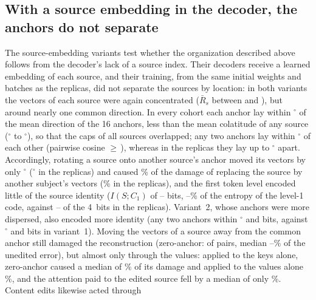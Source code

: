 \documentclass[10pt,letterpaper]{article}
\newcommand{\Rbar}{\bar{R}}
\begin{document}
\subsection*{With a source embedding in the decoder, the anchors do not separate}\label{sec:res-variants}

The source-embedding variants test whether the organization described above follows from the
decoder's lack of a source index. Their decoders receive a learned embedding of each source, and their
training, from the same initial weights and batches as the replicas, did not separate the sources by
location: in both variants the vectors of each source were again concentrated
($\Rbar_s$ between \VarRbarMin{} and \VarRbarMax), but around nearly one common direction. In every
cohort each anchor lay within \VarAnchorToCommonMax$^\circ$ of the mean direction of the 16 anchors, less
than the mean colatitude of any source (\VarAngleMin$^\circ$ to \VarAngleMax$^\circ$), so that the caps
of all sources overlapped; any two anchors lay within \VarAnchorPairAngleMax$^\circ$ of each other
(pairwise cosine $\geq$\,\VarOffdiagMin), whereas in the replicas they lay up to
\RepAnchorPairAngleMax$^\circ$ apart. Accordingly, rotating a source onto another source's anchor
moved its vectors by only \VarDispSwap$^\circ$ (\RepDispSwap$^\circ$ in the replicas) and caused
\VarSwapOverSourceMedianPct\% of the damage of replacing the source by another subject's vectors
(\RepSwapOverSourceMedianPct\% in the replicas), and the first token level encoded little of the
source identity ($I(S;C_1)$ of \VarMILevelOneMin--\VarMILevelOneMax{} bits,
\VarMIShareCodeLevelOneMin--\VarMIShareCodeLevelOneMax\% of the entropy of the level-1 code, against
\RepMILevelOneMin--\RepMILevelOneMax{} of the 4~bits in the replicas). Variant~2, whose anchors were
more dispersed, also encoded more identity (any two anchors within
\VariantTwoAnchorPairAngleMax$^\circ$ and \VariantTwoMILevelOneRange{} bits, against
\VariantOneAnchorPairAngleMax$^\circ$ and \VariantOneMILevelOneRange{} bits in variant~1). Moving the vectors of a source away from the common anchor still
damaged the reconstruction (zero-anchor: \VarZeroAnchorPositiveCount{} of \VarSourceCohortPairs{}
pairs, median \VarZeroAnchorRelMin--\VarZeroAnchorRelMax\% of the unedited error), but almost only
through the values: applied to the keys alone, zero-anchor caused a median of \VarKeysZeroMedianPct\% of
its damage and applied to the values alone \VarValuesZeroMedianPct\%, and the attention paid to the
edited source fell by a median of only \VarAttnDropMedianPct\%. Content edits likewise acted through
\end{document}
